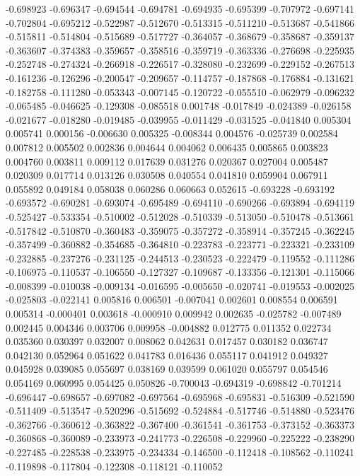 -0.698923
-0.696347
-0.694544
-0.694781
-0.694935
-0.695399
-0.707972
-0.697141
-0.702804
-0.695212
-0.522987
-0.512670
-0.513315
-0.511210
-0.513687
-0.541866
-0.515811
-0.514804
-0.515689
-0.517727
-0.364057
-0.368679
-0.358687
-0.359137
-0.363607
-0.374383
-0.359657
-0.358516
-0.359719
-0.363336
-0.276698
-0.225935
-0.252748
-0.274324
-0.266918
-0.226517
-0.328080
-0.232699
-0.229152
-0.267513
-0.161236
-0.126296
-0.200547
-0.209657
-0.114757
-0.187868
-0.176884
-0.131621
-0.182758
-0.111280
-0.053343
-0.007145
-0.120722
-0.055510
-0.062979
-0.096232
-0.065485
-0.046625
-0.129308
-0.085518
0.001748
-0.017849
-0.024389
-0.026158
-0.021677
-0.018280
-0.019485
-0.039955
-0.011429
-0.031525
-0.041840
0.005304
0.005741
0.000156
-0.006630
0.005325
-0.008344
0.004576
-0.025739
0.002584
0.007812
0.005502
0.002836
0.004644
0.004062
0.006435
0.005865
0.003823
0.004760
0.003811
0.009112
0.017639
0.031276
0.020367
0.027004
0.005487
0.020309
0.017714
0.013126
0.030508
0.040554
0.041810
0.059904
0.067911
0.055892
0.049184
0.058038
0.060286
0.060663
0.052615
-0.693228
-0.693192
-0.693572
-0.690281
-0.693074
-0.695489
-0.694110
-0.690266
-0.693894
-0.694119
-0.525427
-0.533354
-0.510002
-0.512028
-0.510339
-0.513050
-0.510478
-0.513661
-0.517842
-0.510870
-0.360483
-0.359075
-0.357272
-0.358914
-0.357245
-0.362245
-0.357499
-0.360882
-0.354685
-0.364810
-0.223783
-0.223771
-0.223321
-0.233109
-0.232885
-0.237276
-0.231125
-0.244513
-0.230523
-0.222479
-0.119552
-0.111286
-0.106975
-0.110537
-0.106550
-0.127327
-0.109687
-0.133356
-0.121301
-0.115066
-0.008399
-0.010038
-0.009134
-0.016595
-0.005650
-0.020741
-0.019553
-0.002025
-0.025803
-0.022141
0.005816
0.006501
-0.007041
0.002601
0.008554
0.006591
0.005314
-0.000401
0.003618
-0.000910
0.009942
0.002635
-0.025782
-0.007489
0.002445
0.004346
0.003706
0.009958
-0.004882
0.012775
0.011352
0.022734
0.035360
0.030397
0.032007
0.008062
0.042631
0.017457
0.030182
0.036747
0.042130
0.052964
0.051622
0.041783
0.016436
0.055117
0.041912
0.049327
0.045928
0.039085
0.055697
0.038169
0.039599
0.061020
0.055797
0.054546
0.054169
0.060995
0.054425
0.050826
-0.700043
-0.694319
-0.698842
-0.701214
-0.696447
-0.698657
-0.697082
-0.697564
-0.695968
-0.695831
-0.516309
-0.521590
-0.511409
-0.513547
-0.520296
-0.515692
-0.524884
-0.517746
-0.514880
-0.523476
-0.362766
-0.360612
-0.363822
-0.367400
-0.361541
-0.361753
-0.373152
-0.363373
-0.360868
-0.360089
-0.233973
-0.241773
-0.226508
-0.229960
-0.225222
-0.238290
-0.227485
-0.228538
-0.233975
-0.234334
-0.146500
-0.112418
-0.108562
-0.110241
-0.119898
-0.117804
-0.122308
-0.118121
-0.110052
